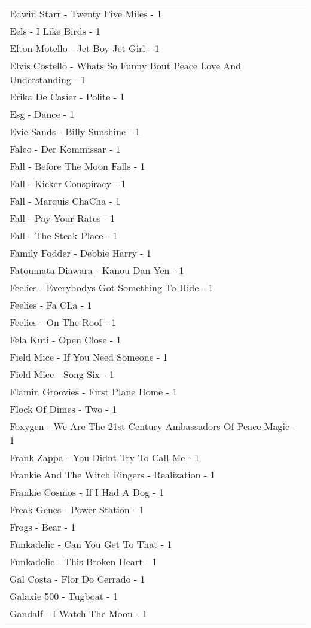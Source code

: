 \documentclass[
]{article}
\begin{document}
\begin{longtable}{l}
Edwin Starr - Twenty Five Miles - 1 \\ 
Eels - I Like Birds - 1 \\ 
Elton Motello - Jet Boy Jet Girl - 1 \\ 
Elvis Costello - Whats So Funny Bout Peace Love And Understanding - 1 \\ 
Erika De Casier - Polite - 1 \\ 
Esg - Dance - 1 \\ 
Evie Sands - Billy Sunshine - 1 \\ 
Falco - Der Kommissar - 1 \\ 
Fall - Before The Moon Falls - 1 \\ 
Fall - Kicker Conspiracy - 1 \\ 
Fall - Marquis ChaCha - 1 \\ 
Fall - Pay Your Rates - 1 \\ 
Fall - The Steak Place - 1 \\ 
Family Fodder - Debbie Harry - 1 \\ 
Fatoumata Diawara - Kanou Dan Yen - 1 \\ 
Feelies - Everybodys Got Something To Hide - 1 \\ 
Feelies - Fa CLa - 1 \\ 
Feelies - On The Roof - 1 \\ 
Fela Kuti - Open Close - 1 \\ 
Field Mice - If You Need Someone - 1 \\ 
Field Mice - Song Six - 1 \\ 
Flamin Groovies - First Plane Home - 1 \\ 
Flock Of Dimes - Two - 1 \\ 
Foxygen - We Are The 21st Century Ambassadors Of Peace Magic - 1 \\ 
Frank Zappa - You Didnt Try To Call Me - 1 \\ 
Frankie And The Witch Fingers - Realization - 1 \\ 
Frankie Cosmos - If I Had A Dog - 1 \\ 
Freak Genes - Power Station - 1 \\ 
Frogs - Bear - 1 \\ 
Funkadelic - Can You Get To That - 1 \\ 
Funkadelic - This Broken Heart - 1 \\ 
Gal Costa - Flor Do Cerrado - 1 \\ 
Galaxie 500 - Tugboat - 1 \\ 
Gandalf - I Watch The Moon - 1 \\ 

\end{longtable}
\end{document}
